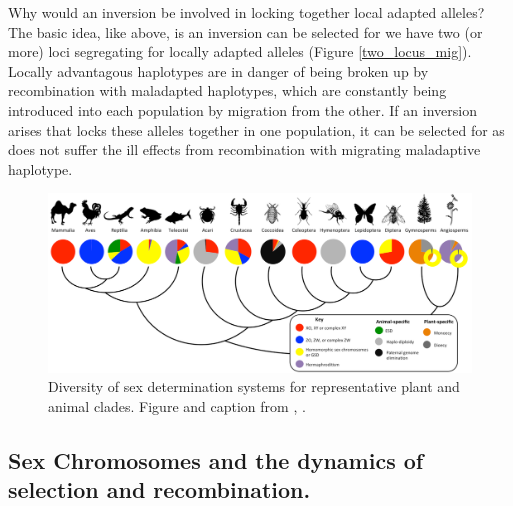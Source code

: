 Why would an inversion be involved in locking together local adapted alleles? The basic idea, like above, is an inversion can be selected for we have two (or more) loci segregating for locally adapted alleles (Figure \ref{two_locus_mig}). Locally advantagous haplotypes are in danger of being broken up by recombination with maladapted haplotypes, which are constantly being
introduced into each population by migration from the other. If an inversion arises that locks these alleles together in one population, it can be selected for as does not suffer the ill effects from recombination with migrating maladaptive haplotype. 
 
\begin{figure} %
\begin{center}
\includegraphics[width = \textwidth]{Journal_figs/recom_selection/Sex_determ_why_so_many_ways/Tree_of_sex.png}
\end{center}
\caption{Diversity of sex determination systems for representative plant and animal clades. Figure and caption from \citet{bachtrog2014sex}, \PLOSccBY. }  \label{fig:Tree_of_sex}
\end{figure}
\subsection{Sex Chromosomes and the dynamics of selection and recombination.}

